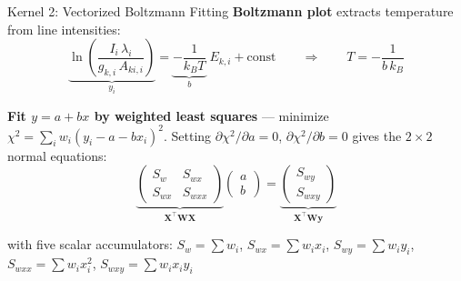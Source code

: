 \documentclass[aspectratio=169,10pt]{beamer}
\begin{document}
\begin{frame}{Kernel 2: Vectorized Boltzmann Fitting}
	\textbf{Boltzmann plot} extracts temperature from line intensities:
	\begin{equation*}
		\underbrace{\ln\!\left(\frac{I_i \,\lambda_i}{g_{k,i}\, A_{ki,i}}\right)}_{y_i}
		= \underbrace{-\frac{1}{k_B T}}_{b}\; E_{k,i} + \text{const}
		\qquad\Longrightarrow\qquad
		T = -\frac{1}{b\, k_B}
	\end{equation*}

	\vspace{-0.2em}
	{\small\textbf{Fit $y = a + bx$ by weighted least squares} --- minimize
	$\chi^2 = \sum_i w_i(y_i - a - bx_i)^2$.
	Setting $\partial\chi^2\!/\partial a = 0$, $\partial\chi^2\!/\partial b = 0$ gives the
	\alert{$2\times 2$ normal equations}:}
	\begin{equation*}
		\underbrace{
		\begin{pmatrix}
			S_w    & S_{wx} \\
			S_{wx} & S_{wxx}
		\end{pmatrix}}_{\bm{X}^\top \bm{W} \bm{X}}
		\begin{pmatrix} a \\ b \end{pmatrix}
		=
		\underbrace{
		\begin{pmatrix} S_{wy} \\ S_{wxy} \end{pmatrix}}_{\bm{X}^\top \bm{W} \bm{y}}
	\end{equation*}

	\vspace{-0.5em}
	{\small with \alert{five scalar accumulators}:
	$S_w\!=\!\sum w_i$,\;
	$S_{wx}\!=\!\sum w_i x_i$,\;
	$S_{wy}\!=\!\sum w_i y_i$,\;
	$S_{wxx}\!=\!\sum w_i x_i^2$,\;
	$S_{wxy}\!=\!\sum w_i x_i y_i$}
\end{frame}
\end{document}

